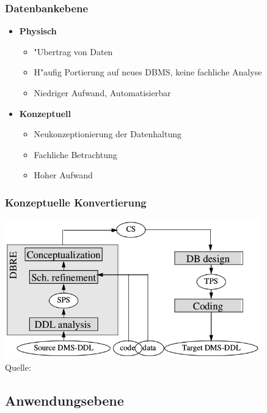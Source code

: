 \documentclass{beamer}
\begin{document}
	\begin{frame}
		\frametitle{Datenbankebene}
		
		\begin{itemize}
			\item \textbf{Physisch}
				\begin{itemize}
					\item "Ubertrag von Daten
					\item H"aufig Portierung auf neues DBMS, keine fachliche Analyse
					\item Niedriger Aufwand, Automatisierbar
				\end{itemize}
			\item \textbf{Konzeptuell}
				\begin{itemize}
					\item Neukonzeptionierung der Datenhaltung
					\item Fachliche Betrachtung
					\item Hoher Aufwand
				\end{itemize}
		\end{itemize}
	\end{frame}	
	
	\begin{frame}
		\frametitle{Konzeptuelle Konvertierung}
		
		\centering
		\includegraphics[height = 6cm]{../images/strategies_fig_02b.png}\\
		\tiny Quelle: \cite{henrard-2002}
	\end{frame}
	
	\subsection{Anwendungsebene}
	
\end{document}
